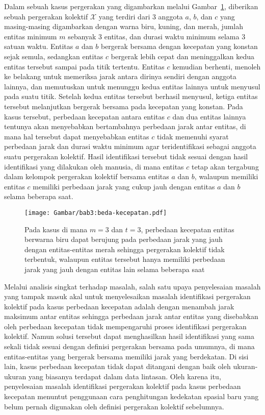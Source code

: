 Dalam sebuah kasus pergerakan yang digambarkan melalui Gambar~\ref{bab3:masalah-kecepatan}, diberikan sebuah pergerakan kolektif $\mathcal{X}$ yang terdiri dari $3$ anggota $a$, $b$, dan $c$ yang masing-masing digambarkan dengan warna biru, kuning, dan merah, jumlah entitas minimum $m$ sebanyak $3$ entitas, dan durasi waktu minimum selama $3$ satuan waktu. Entitas $a$ dan $b$ bergerak bersama dengan kecepatan yang konstan sejak semula, sedangkan entitas $c$ bergerak lebih cepat dan meninggalkan kedua entitas tersebut sampai pada titik tertentu. Entitas $c$ kemudian berhenti, menoleh ke belakang untuk memeriksa jarak antara dirinya sendiri dengan anggota lainnya, dan memutuskan untuk menunggu kedua entitas lainnya untuk menyusul pada suatu titik. Setelah kedua entitas tersebut berhasil menyusul, ketiga entitas tersebut melanjutkan bergerak bersama pada kecepatan yang konstan. Pada kasus tersebut, perbedaan kecepatan antara entitas $c$ dan dua entitas lainnya tentunya akan menyebabkan bertambahnya perbedaan jarak antar entitas, di mana hal tersebut dapat menyebabkan entitas $c$ tidak memenuhi syarat perbedaan jarak dan durasi waktu minimum agar teridentifikasi sebagai anggota suatu pergerakan kolektif. Hasil identifikasi tersebut tidak sesuai dengan hasil identifikasi yang dilakukan oleh manusia, di mana entitas $c$ tetap akan tergabung dalam kelompok pergerakan kolektif bersama entitas $a$ dan $b$, walaupun memiliki entitas $c$ memiliki perbedaan jarak yang cukup jauh dengan entitas $a$ dan $b$ selama beberapa saat.

\begin{figure}[b]
    \centering
    \captionsetup{width=0.75\textwidth}
    \texttt{[image: Gambar/bab3:beda-kecepatan.pdf]}
    \caption[Masalah identifikasi pada kasus perbedaan kecepatan]{Pada kasus di mana $m = 3$ dan $t = 3$, perbedaan kecepatan entitas berwarna biru dapat berujung pada perbedaan jarak yang jauh dengan entitas-entitas merah sehingga pergerakan kolektif tidak terbentuk, walaupun entitas tersebut hanya memiliki perbedaan jarak yang jauh dengan entitas lain selama beberapa saat}
    \label{bab3:masalah-kecepatan}
\end{figure}
    
Melalui analisis singkat terhadap masalah, salah satu upaya penyelesaian masalah yang tampak masuk akal untuk menyelesaikan masalah identifikasi pergerakan kolektif pada kasus perbedaan kecepatan adalah dengan menambah jarak maksimum antar entitas sehingga perbedaan jarak antar entitas yang disebabkan oleh perbedaan kecepatan tidak mempengaruhi proses identifikasi pergerakan kolektif. Namun solusi tersebut dapat menghasilkan hasil identifikasi yang sama sekali tidak sesuai dengan definisi pergerakan bersama pada umumnya, di mana entitas-entitas yang bergerak bersama memiliki jarak yang berdekatan. Di sisi lain, kasus perbedaan kecepatan tidak dapat ditangani dengan baik oleh ukuran-ukuran yang biasanya terdapat dalam data lintasan. Oleh karena itu, penyelesaian masalah identifikasi pergerakan kolektif pada kasus perbedaan kecepatan menuntut penggunaan cara penghitungan kedekatan spasial baru yang belum pernah digunakan oleh definisi pergerakan kolektif sebelumnya.

